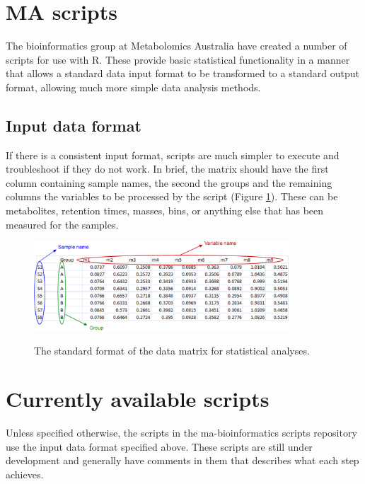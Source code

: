 \documentclass[english,a4paper,12pt]{article}
\begin{document}
\section*{MA scripts}
The bioinformatics group at Metabolomics Australia have created a number of scripts for use with R. These provide basic statistical functionality in a manner that allows a standard data input format to be transformed to a standard output format, allowing much more simple data analysis methods.

\subsection*{Input data format}
If there is a consistent input format, scripts are much simpler to execute and troubleshoot if they do not work. In brief, the matrix should have the first column containing sample names, the second the groups and the remaining columns the variables to be processed by the script (Figure \ref{fig:input_spec}). These can be metabolites, retention times, masses, bins, or anything else that has been measured for the samples.

\begin{figure}[h!tb]
    \centering
    \includegraphics[width=0.85\textwidth]{images/input_spec.png} \\
    \caption[Input data format]{The standard format of the data matrix for statistical analyses.}
    \label{fig:input_spec}
\end{figure}


\section*{Currently available scripts}
Unless specified otherwise, the scripts in the ma-bioinformatics scripts repository use the input data format specified above. These scripts are still under development and generally have comments in them that describes what each step achieves.
\end{document}
